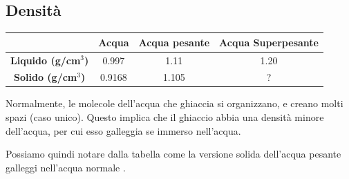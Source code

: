 \documentclass[a4paper]{article}
\begin{document}
\subsection{Densità}

\begin{center}
    \bgroup{}
    \def\arraystretch{1.25}
    \begin{tabular}{ |c|c|c|c| }
        \hline
        & \textbf{Acqua} & \textbf{Acqua pesante} & \textbf{Acqua Superpesante} \\
        \hline
        \textbf{Liquido (g/cm\(^3\))} & 0.997 & 1.11 & 1.20 \\
        \hline
        \textbf{Solido (g/cm\(^3\))} & 0.9168 & 1.105 & ? \\
        \hline
    \end{tabular}
    \egroup{}
\end{center}

Normalmente, le molecole dell'acqua che ghiaccia si organizzano, e creano molti spazi (caso unico).
Questo implica che il ghiaccio abbia una densità minore dell'acqua, per cui esso galleggia se immerso nell'acqua.

Possiamo quindi notare dalla tabella come la versione solida dell'acqua pesante galleggi
nell'acqua normale \cite{deuterated-water}.

\nocite{*} %

\printbibliography

\end{document}
